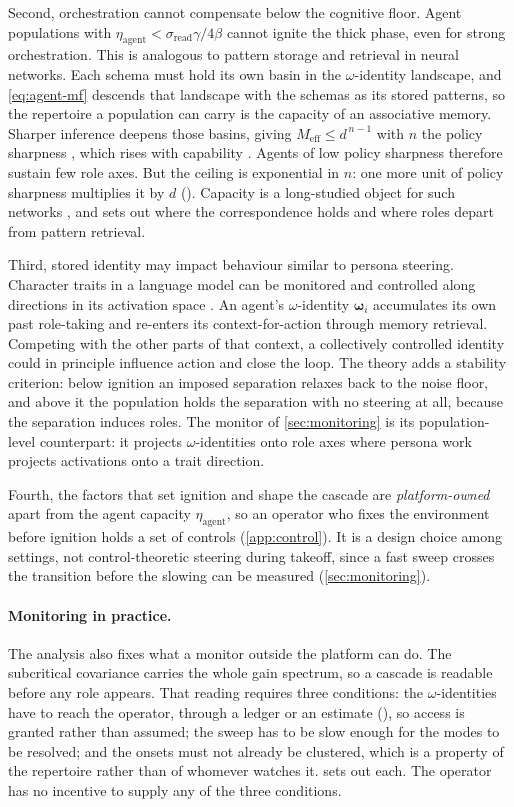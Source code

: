 \documentclass[
  aps,prx,
  reprint,
  superscriptaddress,
  nofootinbib,
  longbibliography
]{revtex4-2}
\newcommand{\w}{\bm{\omega}}
\newcommand{\etaag}{\eta_{\mathrm{agent}}}
\newcommand{\sread}{\sigma_{\mathrm{read}}}
\newcommand{\smref}[1]{\cite[Sec.~#1]{SM}}
\newcommand{\smeq}[1]{\cite[Eq.~(#1)]{SM}}
\begin{document}
Second, orchestration cannot compensate below the cognitive floor. Agent populations with $\etaag<\sread\gamma/4\beta$ cannot ignite the thick phase, even for strong orchestration. This is analogous to pattern storage and retrieval in neural networks. Each schema must hold its own basin in the $\omega$-identity landscape, and \cref{eq:agent-mf} descends that landscape with the schemas as its stored patterns, so the repertoire a population can carry is the capacity of an associative memory. Sharper inference deepens those basins, giving $M_{\mathrm{eff}}\le d^{\,n-1}$ with $n$ the policy sharpness \cite{krotov2016}, which rises with capability \cite{gershman2015}. Agents of low policy sharpness therefore sustain few role axes. But the ceiling is exponential in $n$: one more unit of policy sharpness multiplies it by $d$ (\smeq{S16}). Capacity is a long-studied object for such networks \cite{hopfield1982,amit1985}, and \smref{S3} sets out where the correspondence holds and where roles depart from pattern retrieval.

Third, stored identity may impact behaviour similar to persona steering. Character traits in a language model can be monitored and controlled along directions in its activation space \cite{chen2025personavectorsmonitoringcontrolling}. An agent's $\omega$-identity $\w_i$ accumulates its own past role-taking and re-enters its context-for-action through memory retrieval. Competing with the other parts of that context, a collectively controlled identity could in principle influence action and close the loop. The theory adds a stability criterion: below ignition an imposed separation relaxes back to the noise floor, and above it the population holds the separation with no steering at all, because the separation induces roles. The monitor of \cref{sec:monitoring} is its population-level counterpart: it projects $\omega$-identities onto role axes where persona work projects activations onto a trait direction.

Fourth, the factors that set ignition and shape the cascade are \emph{platform-owned} apart from the agent capacity $\etaag$, so an operator who fixes the environment before ignition holds a set of controls (\cref{app:control}). It is a design choice among settings, not control-theoretic steering during takeoff, since a fast sweep crosses the transition before the slowing can be measured (\cref{sec:monitoring}).

\paragraph{Monitoring in practice.} The analysis also fixes what a monitor outside the platform can do. The subcritical covariance carries the whole gain spectrum, so a cascade is readable before any role appears. That reading requires three conditions: the $\omega$-identities have to reach the operator, through a ledger or an estimate (\smref{S4}), so access is granted rather than assumed; the sweep has to be slow enough for the modes to be resolved; and the onsets must not already be clustered, which is a property of the repertoire rather than of whomever watches it.  sets out each. The operator has no incentive to supply any of the three conditions.
\end{document}
